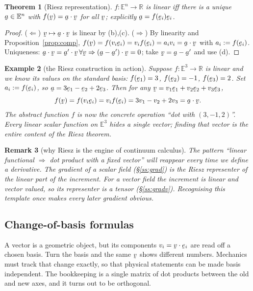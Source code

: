 \documentclass[17pt,a4paper]{extreport}
\DeclareRobustCommand{\vek}[1]{\underaccent{\tilde}{#1}}
\newcommand{\Rn}{\mathbb{R}}
\newcommand{\En}{\mathbb{E}^{n}}
\newcommand{\Et}{\mathbb{E}^{3}}
\newcommand{\ba}{\vek{a}}
\newcommand{\bv}{\vek{v}}
\newcommand{\be}{\vek{e}}
\newcommand{\ip}[2]{#1\cdot#2}
\theoremstyle{scplain}
\newtheorem{theorem}{Theorem}[chapter]
\theoremstyle{scdefn}
\newtheorem{remark}[theorem]{Remark}
\newtheorem{example}[theorem]{Example}
\theoremstyle{scplain}
\begin{document}
\begin{theorem}[Riesz representation]\label{thm:riesz}
$f:\En\to\Rn$ is linear iff there is a unique $\ba\in\En$ with
$f(\bv)=\ip\ba\bv$ for all $\bv$; explicitly $\ba=f(\be_{i})\be_{i}$.
\end{theorem}

\begin{proof}
($\Leftarrow$) $\bv\mapsto\ip\ba\bv$ is linear by (b),(c).
($\Rightarrow$) By linearity and Proposition~\ref{prop:comp},
$f(\bv)=f(v_{i}\be_{i})=v_{i}f(\be_{i})=a_{i}v_{i}=\ip\ba\bv$ with
$a_{i}:=f(\be_{i})$. Uniqueness: $\ip{\ba}{\bv}=\ip{\ba'}{\bv}\,\forall\bv
\Rightarrow\ip{(\ba-\ba')}{\bv}=0$; take $\bv=\ba-\ba'$ and use (d).
\end{proof}

\begin{example}[the Riesz construction in action]\label{ex:riesz}
Suppose $f:\Et\to\Rn$ is linear and we know its values on the standard
basis: $f(\be_{1})=3$, $f(\be_{2})=-1$, $f(\be_{3})=2$. Set
$a_{i}:=f(\be_{i})$, so $\ba=3\be_{1}-\be_{2}+2\be_{3}$. Then for any
$\bv=v_{1}\be_{1}+v_{2}\be_{2}+v_{3}\be_{3}$,
\[
f(\bv)=f(v_{i}\be_{i})=v_{i}f(\be_{i})=3v_{1}-v_{2}+2v_{3}=\ip\ba\bv.
\]
The abstract function $f$ is now the concrete operation ``dot with
$(3,-1,2)$''. Every linear scalar function on $\Et$ hides a single vector;
finding that vector is the entire content of the Riesz theorem.
\end{example}

\begin{remark}[why Riesz is the engine of continuum calculus]\label{rem:rieszengine}
The pattern ``linear functional $\Rightarrow$ dot product with a fixed
vector'' will reappear every time we define a derivative. The gradient of
a scalar field (\S\ref{ss:grad}) is the Riesz representer of the linear
part of the increment. For a vector field the increment is linear and
vector valued, so its representer is a \emph{tensor} (\S\ref{ss:gradv}).
Recognising this template once makes every later gradient obvious.
\end{remark}

\subsection{Change-of-basis formulas}\label{ss:cob}

A vector is a geometric object, but its components $v_i=\ip\bv{\be_i}$ are
read off a chosen basis. Turn the basis and the same $\bv$ shows different
numbers. Mechanics must track that change exactly, so that physical
statements can be made basis independent. The bookkeeping is a single
matrix of dot products between the old and new axes, and it turns out to be
orthogonal.
\end{document}
